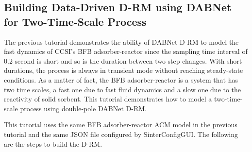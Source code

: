 \subsection{Building Data-Driven D-RM using DABNet for Two-Time-Scale Process}
The previous tutorial demonstrates the ability of DABNet D-RM to model the fast dynamics of CCSI's BFB adsorber-reactor since the sampling time interval of 0.2 second is short and so is the duration between two step changes.  With short durations, the process is always in transient mode without reaching steady-state conditions.  As a matter of fact, the BFB adsorber-reactor is a system that has two time scales, a fast one due to fast fluid dynamics and a slow one due to the reactivity of solid sorbent.  This tutorial demonstrates how to model a two-time-scale process using double-pole DABNet D-RM.

This tutorial uses the same BFB adsorber-reactor ACM model in the previous tutorial and the same JSON file configured by SinterConfigGUI.  The following are the steps to build the D-RM.

